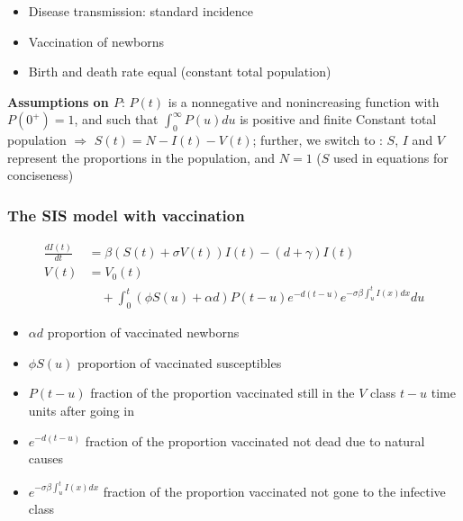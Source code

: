 \documentclass[aspectratio=169]{beamer}\usepackage[]{graphicx}\usepackage[]{xcolor}
\begin{document}
\begin{frame}\frametitle{}
\begin{itemize}
\item Disease transmission: standard incidence
\vfill
\item Vaccination of newborns
\vfill
\item Birth and death rate equal (\imply constant total population)
\end{itemize}

\textbf{Assumptions on $P$}: $P(t)$ is a nonnegative and nonincreasing
function with $P(0^+)=1$, and such that $\int_0^\infty P(u)du$ is
positive and finite
\vfill
Constant total population $\Rightarrow$ $S(t)=N-I(t)-V(t)$; further, we
switch to : $S$, $I$ and $V$ represent the
proportions in the population, and $N=1$ ($S$ used in equations for
conciseness)
\end{frame}

\begin{frame}\frametitle{The SIS model with vaccination} 
\begin{subequations}\label{sys:SIVS_general}
\begin{align}
  \frac{dI(t)}{dt}&= \beta(S(t)+\sigma V(t))I(t)-(d+\gamma)I(t)
  \label{sys:SIVS_general_I}\\ 
  V(t)&= V_0(t) \label{sys:SIVS_general_V} \\
  &\quad +\int_0^t(\phi S(u)+\alpha d)P(t-u)e^{-d(t-u)}
  e^{-\sigma\beta\int_u^tI(x)dx}du \nonumber
\end{align}
\end{subequations}
\vfill
\begin{itemize}
\item $\alpha d$ proportion of vaccinated newborns
\item $\phi S(u)$ proportion of vaccinated susceptibles
\item $P(t-u)$ fraction of the proportion vaccinated still in the $V$
  class $t-u$ time units after going in
\item $e^{-d(t-u)}$ fraction of the proportion vaccinated
not dead due to natural causes
\item $e^{-\sigma\beta\int_u^t I(x)dx}$ fraction of the proportion
  vaccinated not gone to the infective class
\end{itemize} 
\end{frame}
\end{document}
